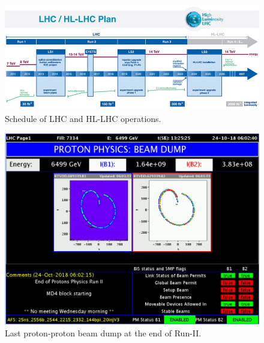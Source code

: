 \begin{figure}
\centering
\includegraphics[scale= 0.5]{../Cap2/lhcplan}
\caption{Schedule of LHC and HL-LHC operations.}
\label{lhcplan}
\end{figure}




\begin{figure}
\centering
\includegraphics[scale= 0.2]{../Cap2/beam}
\caption{Last proton-proton beam dump at the end of Run-II.}
\label{int_lumi_cumulative_pp_1}
\end{figure}
